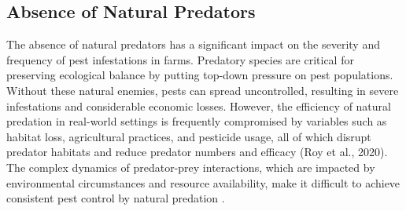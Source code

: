 \subsection{Absence of Natural Predators} The absence of natural predators has a significant impact on the severity and frequency of pest infestations in farms. Predatory species are critical for preserving ecological balance by putting top-down pressure on pest populations. Without these natural enemies, pests can spread uncontrolled, resulting in severe infestations and considerable economic losses. 
    However, the efficiency of natural predation in real-world settings is frequently compromised by variables such as habitat loss, agricultural practices, and pesticide usage, all of which disrupt predator habitats and reduce predator numbers and efficacy (Roy et al., 2020). The complex dynamics of predator-prey interactions, which are impacted by environmental circumstances and resource availability, make it difficult to achieve consistent pest control by natural predation \cite{roy_2020_evaluating}.


